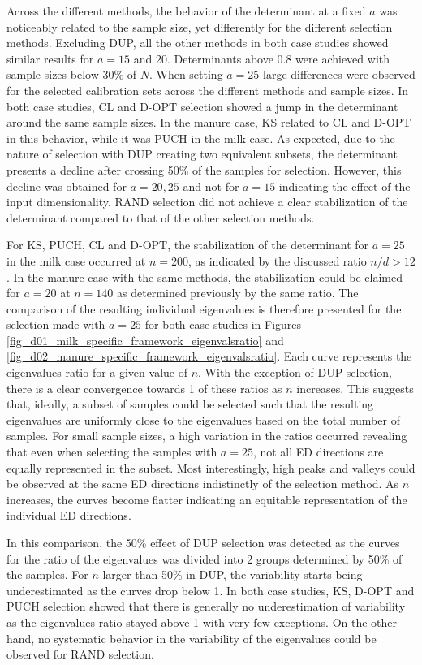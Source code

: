 \documentclass[journal=ancham,manuscript=article]{achemso}
\begin{document}
Across the different methods, the behavior of the determinant at a fixed $a$ was noticeably related to the sample size, yet differently for the different selection methods. Excluding DUP, all the other methods in both case studies showed similar results for $a=15$ and 20. Determinants above 0.8 were achieved with sample sizes below 30\% of $N$. When setting $a=25$ large differences were observed for the selected calibration sets across the different methods and sample sizes. In both case studies, CL and D-OPT selection showed a jump in the determinant around the same sample sizes. In the manure case, KS related to CL and D-OPT in this behavior, while it was PUCH in the milk case. As expected, due to the nature of selection with DUP creating two equivalent subsets, the determinant presents a decline after crossing 50\% of the samples for selection. However, this decline was obtained for $a=20, 25$ and not for $a=15$ indicating the effect of the input dimensionality. RAND selection did not achieve a clear stabilization of the determinant compared to that of the other selection methods.

For KS, PUCH, CL and D-OPT, the stabilization of the determinant for $a=25$ in the milk case occurred at $n=200$, as indicated by the discussed ratio $n/d>12$. In the manure case with the same methods, the stabilization could be claimed for $a=20$ at $n=140$ as determined previously by the same ratio. The comparison of the resulting individual eigenvalues is therefore presented for the selection made with $a = 25$ for both case studies in Figures \ref{fig_d01_milk_specific_framework_eigenvalsratio} and \ref{fig_d02_manure_specific_framework_eigenvalsratio}. Each curve represents the eigenvalues ratio for a given value of $n$. With the exception of DUP selection, there is a clear convergence towards 1 of these ratios as $n$ increases. This suggests that, ideally, a subset of samples could be selected such that the resulting eigenvalues are uniformly close to the eigenvalues based on the total number of samples. For small sample sizes, a high variation in the ratios occurred revealing that even when selecting the samples with $a=25$, not all ED directions are equally represented in the subset. Most interestingly, high peaks and valleys could be observed at the same ED directions indistinctly of the selection method. As $n$ increases, the curves become flatter indicating an equitable representation of the individual ED directions. 

In this comparison, the 50\% effect of DUP selection was detected as the curves for the ratio of the eigenvalues was divided into 2 groups determined by 50\% of the samples. For $n$ larger than 50\% in DUP, the variability starts being underestimated as the curves drop below 1. In both case studies, KS, D-OPT and PUCH selection showed that there is generally no underestimation of variability as the eigenvalues ratio stayed above 1 with very few exceptions. On the other hand, no systematic behavior in the variability of the eigenvalues could be observed for RAND selection. 
\end{document}
